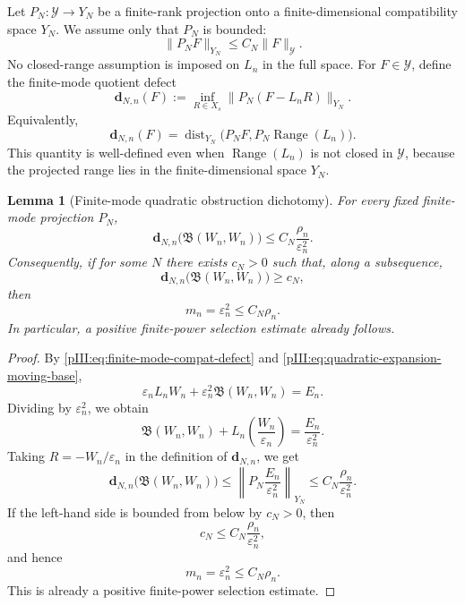 \documentclass[11pt]{article}
\numberwithin{equation}{section}
\theoremstyle{plain}
\newtheorem{lemma}{Lemma}[section]
\theoremstyle{definition}
\theoremstyle{remark}
\DeclareMathOperator{\Range}{Range}
\DeclareMathOperator{\dist}{dist}
\newcommand{\calB}{\mathfrak B}
\newcommand{\calY}{\mathcal Y}
\begin{document}
Let \(P_N:\calY\to Y_N\) be a finite-rank projection onto a finite-dimensional compatibility
space \(Y_N\).  We assume only that \(P_N\) is bounded:
\[
        \|P_NF\|_{Y_N}\le C_N\|F\|_{\calY}.
\]
No closed-range assumption is imposed on \(L_n\) in the full space.  For \(F\in\calY\), define the
finite-mode quotient defect
\begin{equation}\label{pIII:eq:finite-mode-defect}
        \mathbf d_{N,n}(F)
        :=
        \inf_{R\in X_s}\|P_N(F-L_nR)\|_{Y_N}.
\end{equation}
Equivalently,
\[
        \mathbf d_{N,n}(F)
        =
        \dist_{Y_N}\bigl(P_NF, P_N\Range(L_n)\bigr).
\]
This quantity is well-defined even when \(\Range(L_n)\) is not closed in \(\calY\), because the
projected range lies in the finite-dimensional space \(Y_N\).

\begin{lemma}[Finite-mode quadratic obstruction dichotomy]
\label{pIII:lem:finite-mode-quadratic-obstruction}
For every fixed finite-mode projection \(P_N\),
\begin{equation}\label{pIII:eq:finite-mode-quadratic-bound}
        \mathbf d_{N,n}\bigl(\calB(W_n,W_n)\bigr)
        \le
        C_N\frac{\rho_n}{\varepsilon_n^2}.
\end{equation}
Consequently, if for some \(N\) there exists \(c_N>0\) such that, along a subsequence,
\[
        \mathbf d_{N,n}\bigl(\calB(W_n,W_n)\bigr)\ge c_N,
\]
then
\[
        m_n=\varepsilon_n^2\le C_N\rho_n.
\]
In particular, a positive finite-power selection estimate already follows.
\end{lemma}

\begin{proof}
By \eqref{pIII:eq:finite-mode-compat-defect} and \eqref{pIII:eq:quadratic-expansion-moving-base},
\[
        \varepsilon_nL_nW_n+\varepsilon_n^2\calB(W_n,W_n)=E_n.
\]
Dividing by \(\varepsilon_n^2\), we obtain
\[
        \calB(W_n,W_n)+L_n\left(\frac{W_n}{\varepsilon_n}\right)
        =\frac{E_n}{\varepsilon_n^2}.
\]
Taking \(R=-W_n/\varepsilon_n\) in the definition of \(\mathbf d_{N,n}\), we get
\[
        \mathbf d_{N,n}\bigl(\calB(W_n,W_n)\bigr)
        \le
        \left\|P_N\frac{E_n}{\varepsilon_n^2}\right\|_{Y_N}
        \le
        C_N\frac{\rho_n}{\varepsilon_n^2}.
\]
If the left-hand side is bounded from below by \(c_N>0\), then
\[
        c_N\le C_N\frac{\rho_n}{\varepsilon_n^2},
\]
and hence
\[
        m_n=\varepsilon_n^2\le C_N\rho_n.
\]
This is already a positive finite-power selection estimate.
\end{proof}
\end{document}
